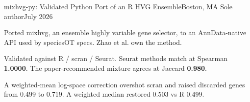   \resumeSubheading
    {\href{https://github.com/JunyiZhou-Conny/mixhvg-py}{mixhvg-py: Validated Python Port of an R HVG Ensemble}}{Boston, MA}
    {Sole author}{July 2026}
    \resumeItemListStart
      \item Ported mixhvg, an ensemble highly variable gene selector, to an AnnData-native API used by speciesOT specs. Zhao et al. own the method.
      \item Validated against R / scran / Seurat. Seurat methods match at Spearman \textbf{1.0000}. The paper-recommended mixture agrees at Jaccard \textbf{0.980}.
      \item A weighted-mean log-space correction overshot scran and raised discarded genes from 0.499 to 0.719. A weighted median restored 0.503 vs R 0.499.
    \resumeItemListEnd

\resumeSubHeadingListEnd



